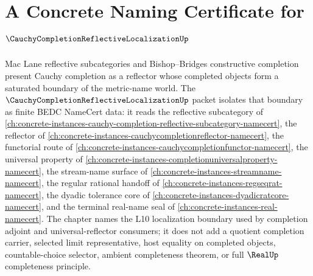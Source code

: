 \chapter{A Concrete Naming Certificate for $\CauchyCompletionReflectiveLocalizationUp$}
\label{ch:concrete-instances-cauchy-completion-reflective-localization-namecert}

Mac Lane reflective subcategories and Bishop--Bridges constructive completion present Cauchy completion as a reflector whose completed objects form a saturated boundary of the metric-name world. The $\CauchyCompletionReflectiveLocalizationUp$ packet isolates that boundary as finite BEDC NameCert data: it reads the reflective subcategory of \autoref{ch:concrete-instances-cauchy-completion-reflective-subcategory-namecert}, the reflector of \autoref{ch:concrete-instances-cauchycompletionreflector-namecert}, the functorial route of \autoref{ch:concrete-instances-cauchycompletionfunctor-namecert}, the universal property of \autoref{ch:concrete-instances-completionuniversalproperty-namecert}, the stream-name surface of \autoref{ch:concrete-instances-streamname-namecert}, the regular rational handoff of \autoref{ch:concrete-instances-regseqrat-namecert}, the dyadic tolerance core of \autoref{ch:concrete-instances-dyadicratcore-namecert}, and the terminal real-name seal of \autoref{ch:concrete-instances-real-namecert}. The chapter names the L10 localization boundary used by completion adjoint and universal-reflector consumers; it does not add a quotient completion carrier, selected limit representative, host equality on completed objects, countable-choice selector, ambient completeness theorem, or full $\RealUp$ completeness principle.

